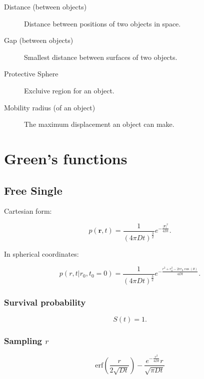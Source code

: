 \documentclass[english]{article}
\begin{document}
\begin{description}
\item[Distance (between objects)] Distance between positions of two
  objects in space.
\item[Gap (between objects)] Smallest distance between surfaces of two objects.
\item[Protective Sphere] Excluive region for an object.
\item[Mobility radius (of an object)] The maximum displacement an
  object can make.

\end{description}



\section{Green's functions}


\subsection{Free Single}

Cartesian form:

\begin{equation}
p(\mathbf{r},t)=
\frac{1}{(4\pi Dt)^{\frac{3}{2}}}e^{-\frac{|\mathbf{r}|^{2}}{4Dt}}.
\end{equation}


In spherical coordinates:

\begin{equation}
  p(r,t|r_{0},t_{0}=0)=
  \frac{1}{(4\pi Dt)^{\frac{3}{2}}}
  e^{-\frac{r^{2}+r_{0}^{2}-2rr_{0}\cos(\theta)}
    {4Dt}}.
\end{equation}


\subsubsection{Survival probability}

\begin{equation}
S(t)=1.
\end{equation}


\subsubsection{Sampling $r$}

\begin{equation}
\mathrm{erf}\left(\frac{r}{2 \sqrt{Dt}}\right) 
- \frac{e^{-\frac{r^2}{4 D t}} r}{\sqrt{\pi D t}}
\end{equation}
\end{document}
